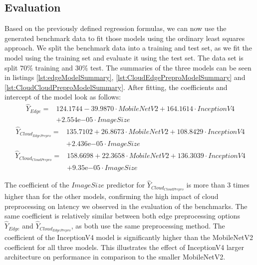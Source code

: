 \subsection{Evaluation}
Based on the previously defined regression formulas, we can now use the generated benchmark data to fit those models using the ordinary least squares approach.
We split the benchmark data into a training and test set, as we fit the model using the training set and evaluate it using the test set.
The data set is split $70\%$ training and $30\%$ test.
The summaries of the three models can be seen in listings \ref{lst:edgeModelSummary}, \ref{lst:CloudEdgePreproModelSummary} and \ref{lst:CloudCloudPreproModelSummary}.
After fitting, the coefficients and intercept of the model look as follows:
\begin{equation*}
\begin{split}
\hat{Y}_{Edge} =& 124.1744      -39.9870\cdot MobileNetV2 + 164.1614\cdot InceptionV4\\
&+2.554\mathrm{e}{-05}\cdot ImageSize
\end{split}
\end{equation*}
\begin{equation*}
\begin{split}
\hat{Y}_{Cloud_{EdgePrepro}} = &
135.7102 + 26.8673\cdot MobileNetV2+ 108.8429\cdot InceptionV4\\
&+2.436\mathrm{e}{-05}\cdot ImageSize
\end{split}
\end{equation*}
\begin{equation*}
\begin{split}
\hat{Y}_{Cloud_{CloudPrepro}} = &
158.6698 + 22.3658\cdot MobileNetV2+ 136.3039\cdot InceptionV4\\
&+9.35\mathrm{e}{-05}\cdot ImageSize
\end{split}
\end{equation*}

The coefficient of the $ImageSize$ predictor for $\hat{Y}_{Cloud_{CloudPrepro}}$ is more than $3$ times higher than for the other models, confirming the high impact of cloud preprocessing on latency we observed in the evaluation of the benchmarks.
The same coefficient is relatively similar between both edge preprocessing options $\hat{Y}_{Edge}$ and $\hat{Y}_{Cloud_{EdgePrepro}}$, as both use the same preprocessing method.
The coefficient of the InceptionV4 model is significantly higher than the MobileNetV2 coefficient for all three models.
This illustrates the effect of InceptionV4 larger architecture on performance in comparison to the smaller MobileNetV2.

